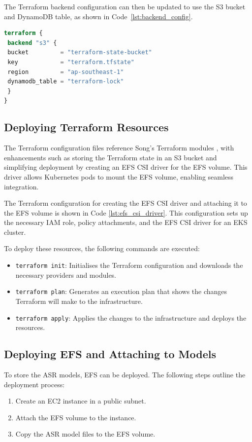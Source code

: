 The Terraform backend configuration can then be updated to use the S3 bucket and DynamoDB table, as shown in Code~\ref{lst:backend_config}.

\begin{lstlisting}[language=Terraform, caption={Terraform Backend Configuration}, label={lst:backend_config}]
terraform {
 backend "s3" {
 bucket         = "terraform-state-bucket"
 key            = "terraform.tfstate"
 region         = "ap-southeast-1"
 dynamodb_table = "terraform-lock"
 }
}
\end{lstlisting}

\subsection{Deploying Terraform Resources}
The Terraform configuration files reference Song's Terraform modules \cite{song_yu}, with enhancements such as storing the Terraform state in an S3 bucket and simplifying deployment by creating an EFS CSI driver for the EFS volume. This driver allows Kubernetes pods to mount the EFS volume, enabling seamless integration.

The Terraform configuration for creating the EFS CSI driver and attaching it to the EFS volume is shown in Code \ref{lst:efs_csi_driver}. This configuration sets up the necessary IAM role, policy attachments, and the EFS CSI driver for an EKS cluster.

To deploy these resources, the following commands are executed:
\begin{itemize}
    \item \texttt{terraform init}: Initialises the Terraform configuration and downloads the necessary providers and modules.
    \item \texttt{terraform plan}: Generates an execution plan that shows the changes Terraform will make to the infrastructure.
    \item \texttt{terraform apply}: Applies the changes to the infrastructure and deploys the resources.
\end{itemize}

\subsection{Deploying EFS and Attaching to Models}
To store the ASR models, EFS can be deployed. The following steps outline the deployment process:
\begin{enumerate}
    \item Create an EC2 instance in a public subnet.
    \item Attach the EFS volume to the instance.
    \item Copy the ASR model files to the EFS volume.
\end{enumerate}


